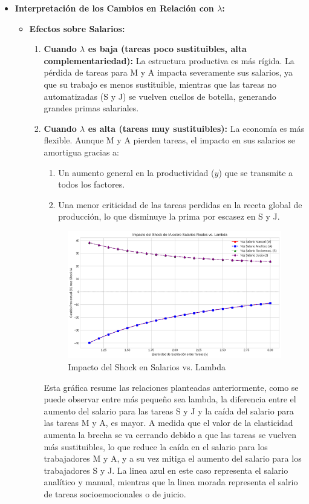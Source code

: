 \documentclass{article}
\theoremstyle{remark}
\theoremstyle{definition}
\begin{document}
\begin{enumerate}
\begin{tcolorbox}[title= Soluci\'on 5]
\begin{itemize}
  \item \textbf{Interpretación de los Cambios en Relación con \(\lambda\):}
    \begin{itemize}
      \item \textbf{Efectos sobre Salarios:}
        \begin{enumerate}[label=\alph*)]
          \item \textbf{Cuando \(\lambda\) es baja (tareas poco sustituibles, alta complementariedad):} La estructura productiva es más rígida. La pérdida de tareas para M y A impacta severamente sus salarios, ya que su trabajo es menos sustituible, mientras que las tareas no automatizadas (S y J) se vuelven cuellos de botella, generando grandes primas salariales.
          \item \textbf{Cuando \(\lambda\) es alta (tareas muy sustituibles):} La economía es más flexible. Aunque M y A pierden tareas, el impacto en sus salarios se amortigua gracias a: 
            \begin{enumerate}[label=\roman*)]
              \item Un aumento general en la productividad (\(y\)) que se transmite a todos los factores.
              \item Una menor criticidad de las tareas perdidas en la receta global de producción, lo que disminuye la prima por escasez en S y J.
            \end{enumerate}

            \begin{figure}[H] 
                \centering
                \includegraphics[width=0.7\linewidth]{views/entrega2/61.png}
                \caption{Impacto del Shock en Salarios  vs. Lambda}
                \label{fig:graflamb}
            \end{figure}
            Esta gr\'afica resume las relaciones planteadas anteriormente, como se puede observar entre m\'as pequeño sea lambda, la diferencia entre el aumento del salario para las tareas S y J y la caída del salario para las tareas M y A, es mayor. A medida que el valor de la elasticidad aumenta la brecha se va cerrando debido a que las tareas se vuelven m\'as sustituibles, lo que reduce la ca\'ida en el salario para los trabajadores M y A, y a su vez mitiga el aumento del salario para los trabajadores S y J. La linea azul en este caso representa el salario anal\'itico y manual,  mientras que la linea morada representa el salrio de tareas socioemocionales o de juicio.
        \end{enumerate}
        

\end{itemize}
\end{itemize}
\end{tcolorbox}
\end{enumerate}
\end{document}
